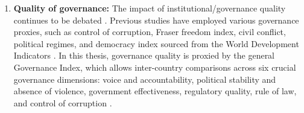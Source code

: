 \begin{enumerate}[i]
    
    \item \textbf{Quality of governance:} The impact of institutional/governance quality continues to be debated \parencite[e.g.][]{doucouliagos_health_2021, williamson_foreign_2008}. Previous studies have employed various governance proxies, such as control of corruption, Fraser freedom index, civil conflict, political regimes, and democracy index sourced from the World Development Indicators \parencite{shafiullah_foreign_2011, muhammad_health_2021, toseef_how_2019, williamson_foreign_2008, kavakli_us_2022, yogo_health_2015}. In this thesis, governance quality is proxied by the general Governance Index, which allows inter-country comparisons across six crucial governance dimensions: voice and accountability, political stability and absence of violence, government effectiveness, regulatory quality, rule of law, and control of corruption \parencite[see][for detailed description of the index]{handoyo2023worldwide, wdi_world_2023}.
\end{enumerate}









     
       






 
 

